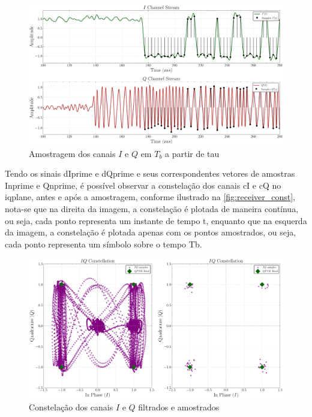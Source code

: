 \begin{figure}[H]
	\centering
	\caption{Amostragem dos canais $I$ e $Q$ em $T_b$ a partir de \gls{tau}}\label{fig:receiver_sampler}
	\includegraphics[width=\linewidth]{assets/cap3/receiver_sampler_time.pdf}
\end{figure}

Tendo os sinais \gls{dIprime} e \gls{dQprime} e seus correspondentes vetores de amostras \gls{Inprime} e \gls{Qnprime}, é possível observar a constelação dos canais \gls{cI} e \gls{cQ} no \gls{iqplane}, antes e após a amostragem, conforme ilustrado na \autoref{fig:receiver_const}, nota-se que na direita da imagem, a constelação é plotada de maneira contínua, ou seja, cada ponto representa um instante de tempo \gls{t}, enquanto que na esquerda da imagem, a constelação é plotada apenas com os pontos amostrados, ou seja, cada ponto representa um símbolo sobre o tempo \gls{Tb}. 

\begin{figure}[H]
	\centering
	\caption{Constelação dos canais $I$ e $Q$ filtrados e amostrados}\label{fig:receiver_const}
	\includegraphics[width=\linewidth]{assets/cap3/receiver_sampler_const.pdf}
\end{figure}

